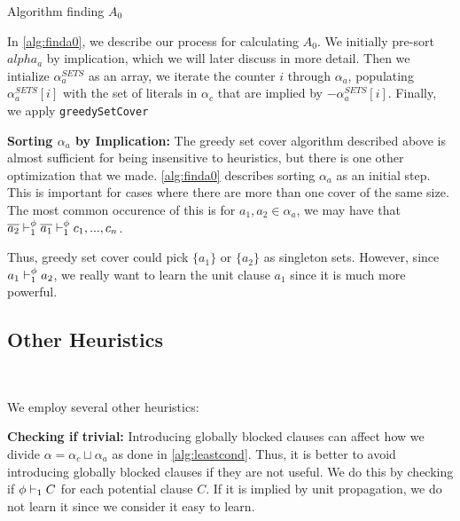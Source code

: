 \begin{algorithm}
    \caption{Algorithm finding $A_0$}\label{alg:finda0}
    \SetAlgoNoLine

\end{algorithm}

In \autoref{alg:finda0}, we describe our process for calculating $A_0$. We initially pre-sort $alpha_a$ by implication, which we will later discuss in more detail. Then we intialize $\alpha_a^{SETS}$ as an array, we iterate the counter $i$ through $\alpha_a$, populating $\alpha_a^{SETS}[i]$ with the set of literals in $\alpha_c$ that are implied by $-\alpha_a^{SETS}[i]$. Finally, we apply \texttt{greedySetCover}



\noindent \textbf{Sorting $\alpha_a$ by Implication:}%
The greedy set cover algorithm described above is almost sufficient for being insensitive to heuristics, but there is one other optimization that we made. \autoref{alg:finda0} describes sorting $\alpha_a$ as an initial step. This is important for cases where there are more than one cover of the same size. The most common occurence of this is for $a_1, a_2 \in \alpha_a$, we may have that $\overline{a_2} \vdash_1^\phi \overline{a_1} \vdash_1^\phi c_1, ..., c_n$. 

Thus, greedy set cover could pick $\{a_1\}$ or $\{a_2\}$ as singleton sets. However, since $a_1 \vdash_1^\phi a_2$, we really want to learn the unit clause $a_1$ since it is much more powerful.

\subsection{Other Heuristics}~\label{subsec:heuristics}

We employ several other heuristics:

\noindent \textbf{Checking if trivial:} Introducing globally blocked clauses can affect how we divide $\alpha = \alpha_c \sqcup \alpha_a$ as done in \autoref{alg:leastcond}. Thus, it is better to avoid introducing globally blocked clauses if they are not useful. We do this by checking if $\phi \vdash_1 C$ for each potential clause $C$. If it is implied by unit propagation, we do not learn it since we consider it easy to learn.

